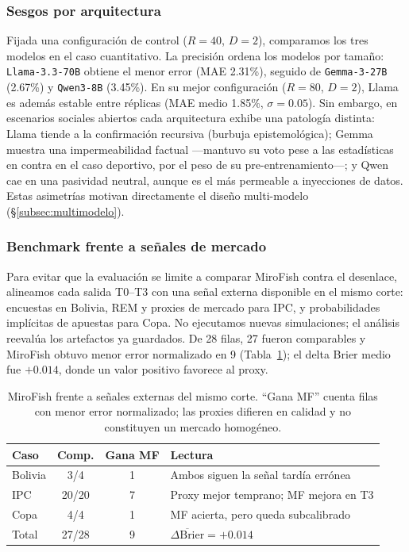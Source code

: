 \documentclass[11pt]{article}
\begin{document}
\subsubsection{Sesgos por arquitectura}

Fijada una configuración de control ($R=40$, $D=2$), comparamos los tres modelos en el caso cuantitativo. La precisión ordena los modelos por tamaño: \texttt{Llama-3.3-70B} obtiene el menor error (MAE 2.31\%), seguido de \texttt{Gemma-3-27B} (2.67\%) y \texttt{Qwen3-8B} (3.45\%). En su mejor configuración ($R=80$, $D=2$), Llama es además estable entre réplicas (MAE medio 1.85\%, $\sigma = 0.05$). Sin embargo, en escenarios sociales abiertos cada arquitectura exhibe una patología distinta: Llama tiende a la confirmación recursiva (burbuja epistemológica); Gemma muestra una impermeabilidad factual —mantuvo su voto pese a las estadísticas en contra en el caso deportivo, por el peso de su pre-entrenamiento—; y Qwen cae en una pasividad neutral, aunque es el más permeable a inyecciones de datos. Estas asimetrías motivan directamente el diseño multi-modelo (§\ref{subsec:multimodelo}).





\subsubsection{Benchmark frente a señales de mercado}

Para evitar que la evaluación se limite a comparar MiroFish contra el desenlace, alineamos cada salida T0--T3 con una señal externa disponible en el mismo corte: encuestas en Bolivia, REM y proxies de mercado para IPC, y probabilidades implícitas de apuestas para Copa. No ejecutamos nuevas simulaciones; el análisis reevalúa los artefactos ya guardados. De 28 filas, 27 fueron comparables y MiroFish obtuvo menor error normalizado en 9 (Tabla~\ref{tab:market_baseline}); el delta Brier medio fue $+0.014$, donde un valor positivo favorece al proxy.

\begin{table}[H]
\centering
\small
\begin{tabular}{@{}lccp{3.0cm}@{}}
\toprule
\textbf{Caso} & \textbf{Comp.} & \textbf{Gana MF} & \textbf{Lectura} \\
\midrule
Bolivia & 3/4 & 1 & Ambos siguen la señal tardía errónea \\
IPC & 20/20 & 7 & Proxy mejor temprano; MF mejora en T3 \\
Copa & 4/4 & 1 & MF acierta, pero queda subcalibrado \\
\midrule
Total & 27/28 & 9 & $\overline{\Delta\text{Brier}}=+0.014$ \\
\bottomrule
\end{tabular}
\caption{MiroFish frente a señales externas del mismo corte. ``Gana MF'' cuenta filas con menor error normalizado; las proxies difieren en calidad y no constituyen un mercado homogéneo.}
\label{tab:market_baseline}
\end{table}
\end{document}

